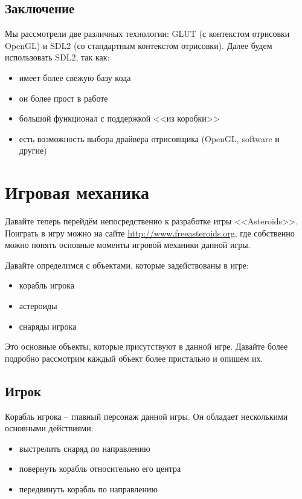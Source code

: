 \subsection{Заключение}
Мы рассмотрели две различных технологии: GLUT (с контекстом отрисовки OpenGL) и SDL2 (со стандартным 
контекстом отрисовки). Далее будем использовать SDL2, так как:
\begin{itemize}\itemsep-5pt
    \item имеет более свежую базу кода
    \item он более прост в работе
    \item большой функционал с поддержкой <<из коробки>>
    \item есть возможность выбора драйвера отрисовщика (OpenGL, software и другие)
\end{itemize} 

\pagebreak

\section{Игровая механика}

Давайте теперь перейдём непосредственно к разработке игры <<Asteroids>>. Поиграть в игру можно на сайте 
\url{http://www.freeasteroids.org}, где собственно можно понять основные моменты игровой механики данной 
игры.

Давайте определимся с объектами, которые задействованы в игре:
\begin{itemize}\itemsep-5pt
    \item корабль игрока
    \item астероиды
    \item снаряды игрока
\end{itemize}

Это основные объекты, которые присутствуют в данной игре. Давайте более подробно рассмотрим каждый объект 
более пристально и опишем их.

\subsection{Игрок}
Корабль игрока -- главный персонаж данной игры. Он обладает несколькими основными действиями:
\begin{itemize}\itemsep-5pt
    \item выстрелить снаряд по направлению
    \item повернуть корабль относительно его центра
    \item передвинуть корабль по направлению
\end{itemize}

